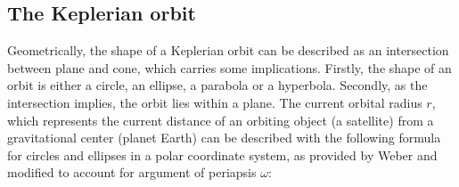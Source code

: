 \documentclass[11pt,a4paper]{article}
\begin{document}
	\subsection{The Keplerian orbit}
	\label{sec:kepler_orbit}
	Geometrically, the shape of a Keplerian orbit can be described as an intersection between plane and cone, which carries some implications. Firstly, the shape of an orbit is either a circle, an ellipse, a parabola or a hyperbola. Secondly, as the intersection implies, the orbit lies within a plane. \cite{orbit_equation} \newline
	The current orbital radius $r$, which represents the current distance of an orbiting object (a satellite) from a gravitational center (planet Earth) can be described with the following formula for circles and ellipses in a polar coordinate system, as provided by Weber \cite{elliptical_orbits} and modified to account for argument of periapsis $\omega$: 
	
\end{document}
